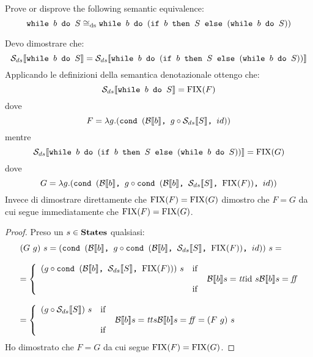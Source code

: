 {Prove or disprove the following semantic equivalence:
$$
\wbS{b}{S} \eqDS \wbS{b}{(\ifABC{b}{S}{(\wbS{b}{S})})}
$$	
}
{
Devo dimostrare che:
$$
\dsCtxt{\wbS{b}{S}} = \dsCtxt{\wbS{b}{(\ifABC{b}{S}{(\wbS{b}{S})})}}
$$	
Applicando le definizioni della semantica denotazionale ottengo che:
$$
\dsCtxt{\wbS{b}{S}} = \fixp{F}
$$
dove 
$$
F = \lambda g. (\cond{b}{g \circ \dsCtxt{S}}{id})
$$
mentre
$$
\dsCtxt{\wbS{b}{(\ifABC{b}{S}{(\wbS{b}{S})})}} = \fixp{G}
$$
dove
$$
G = \lambda g .(\cond{b}{g \circ \cond{b}{\dsCtxt{S}}{\fixp{F}}}{id})
$$
Invece di dimostrare direttamente che $\fixp{F} = \fixp{G}$ dimostro 
che $F = G$ da cui segue immediatamente che $\fixp{F} = \fixp{G}$.

\begin{proof}
Preso un $s \in \states$ qualsiasi:
$$
\begin{array}{l}
(G\ g)\ s =
(\cond{b}{g \circ \cond{b}{\dsCtxt{S}}{\fixp{F}}}{id})\ s =\\
\\
= \caseFun{(g \circ \cond{b}{\dsCtxt{S}}{\fixp{F}})\ s}
          {\B{b} =\semtrue}
          {\idDS\ s}
          {\B{b} = \semfalse} \\
\\
= \caseFun{(g \circ \dsCtxt{S})\ s}
          {\B{b} = \semtrue}
          {s}
          {\B{b} = \semfalse} =
(F\ g)\ s
\end{array}
$$ 
Ho dimostrato che $F = G$ da cui segue $\fixp{F} = \fixp{G}$.
\end{proof}
	
}
